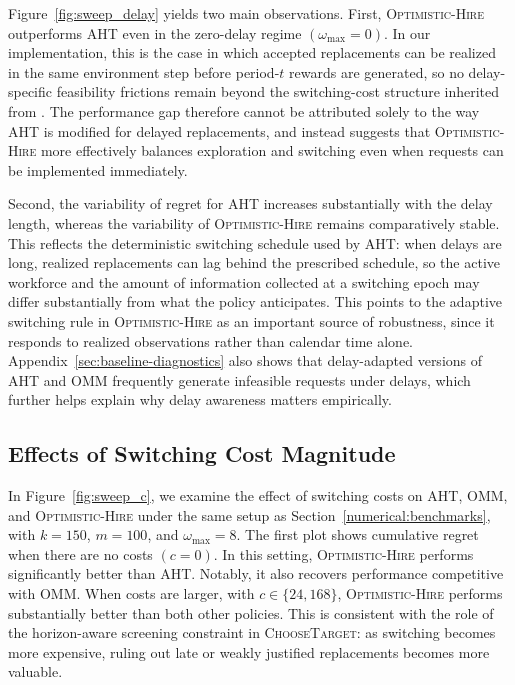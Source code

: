 \documentclass[opre,blindrev]{informs3}
\newcommand{\ChooseTarget}{\textsc{ChooseTarget}}
\begin{document}
Figure~\ref{fig:sweep_delay} yields two main observations. First, \textsc{Optimistic-Hire} outperforms \textsc{AHT} even in the zero-delay regime \((\omega_{\max}=0)\). In our implementation, this is the case in which accepted replacements can be realized in the same environment step before period-\(t\) rewards are generated, so no delay-specific feasibility frictions remain beyond the switching-cost structure inherited from \cite{agrawal1990switching}. The performance gap therefore cannot be attributed solely to the way \textsc{AHT} is modified for delayed replacements, and instead suggests that \textsc{Optimistic-Hire} more effectively balances exploration and switching even when requests can be implemented immediately.

Second, the variability of regret for \textsc{AHT} increases substantially with the delay length, whereas the variability of \textsc{Optimistic-Hire} remains comparatively stable. This reflects the deterministic switching schedule used by \textsc{AHT}: when delays are long, realized replacements can lag behind the prescribed schedule, so the active workforce and the amount of information collected at a switching epoch may differ substantially from what the policy anticipates. This points to the adaptive switching rule in \textsc{Optimistic-Hire} as an important source of robustness, since it responds to realized observations rather than calendar time alone. Appendix~\ref{sec:baseline-diagnostics} also shows that delay-adapted versions of \textsc{AHT} and \textsc{OMM} frequently generate infeasible requests under delays, which further helps explain why delay awareness matters empirically.


\subsection{Effects of Switching Cost Magnitude}
In Figure~\ref{fig:sweep_c}, we examine the effect of switching costs on \textsc{AHT}, \textsc{OMM}, and \textsc{Optimistic-Hire} under the same setup as Section~\ref{numerical:benchmarks}, with \(k=150\), \(m=100\), and \(\omega_{\max}=8\). The first plot shows cumulative regret when there are no costs \((c=0)\). In this setting, \textsc{Optimistic-Hire} performs significantly better than \textsc{AHT}. Notably, it also recovers performance competitive with \textsc{OMM}. When costs are larger, with \(c\in \{24, 168\}\), \textsc{Optimistic-Hire} performs substantially better than both other policies. This is consistent with the role of the horizon-aware screening constraint in \ChooseTarget: as switching becomes more expensive, ruling out late or weakly justified replacements becomes more valuable.
\end{document}
